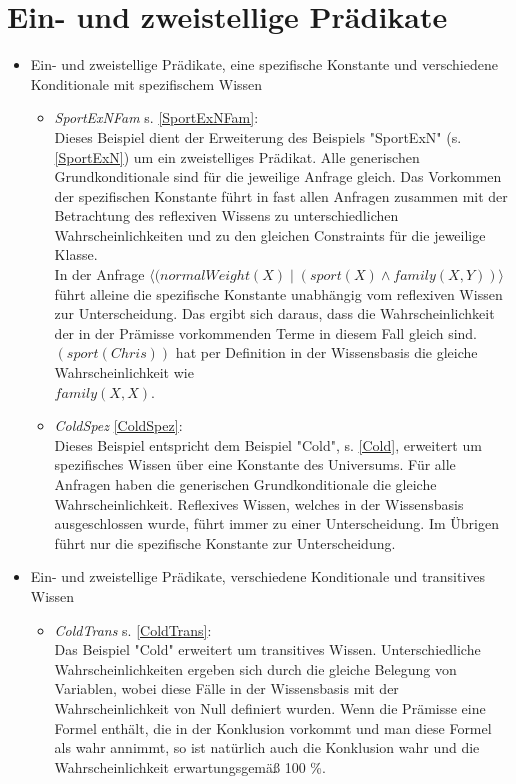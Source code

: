 \documentclass[a4paper, 11pt]{book}
\begin{document}
\section{Ein- und zweistellige Prädikate}
\begin{itemize}
\item{Ein- und zweistellige Prädikate, eine spezifische Konstante und verschiedene Konditionale mit spezifischem Wissen}
\begin{itemize}
	\item \textsl{SportExNFam} \label{BSportExNFam} s. \ref{SportExNFam}:\\
	Dieses Beispiel dient der Erweiterung des Beispiels "{}SportExN"{} (s. \ref{SportExN}) um ein zweistelliges Prädikat. Alle generischen Grundkonditionale sind für die jeweilige Anfrage gleich. Das Vorkommen der spezifischen Konstante führt in fast allen Anfragen zusammen mit der Betrachtung des reflexiven Wissens zu unterschiedlichen Wahrscheinlichkeiten und zu den gleichen Constraints für die jeweilige Klasse.\\
	In der Anfrage $\langle (normalWeight(X) \mid (sport(X) \land family(X,Y)) \rangle$\\ führt alleine die spezifische Konstante unabhängig vom reflexiven Wissen zur Unterscheidung. Das ergibt sich daraus, dass die Wahrscheinlichkeit der in der Prämisse vorkommenden Terme in diesem Fall gleich sind. $(sport(Chris)) $ hat per Definition in der Wissensbasis die gleiche Wahrscheinlichkeit wie \\ $family(X,X)$.
	\item \textsl{ColdSpez} \label{BColdSpez} \ref{ColdSpez}:\\
Dieses Beispiel entspricht dem Beispiel "{}Cold"{}, s. \ref{Cold}, erweitert um spezifisches Wissen über eine Konstante des Universums. Für alle Anfragen haben die generischen Grundkonditionale die gleiche Wahrscheinlichkeit. Reflexives Wissen, welches in der Wissensbasis ausgeschlossen wurde, führt immer zu einer Unterscheidung. Im Übrigen führt nur die spezifische Konstante zur Unterscheidung.
\end{itemize}


\item{Ein- und zweistellige Prädikate, verschiedene Konditionale und transitives Wissen}
\begin{itemize}
	\item \textsl{ColdTrans} \label{BColdTrans} s. \ref{ColdTrans}:\\
Das Beispiel "{}Cold"{} erweitert um transitives Wissen. Unterschiedliche Wahrscheinlichkeiten ergeben sich durch die gleiche Belegung von Variablen, wobei diese Fälle in der Wissensbasis mit der Wahrscheinlichkeit von Null definiert wurden. Wenn die Prämisse eine Formel enthält, die in der Konklusion vorkommt und man diese Formel als wahr annimmt, so ist natürlich auch die Konklusion wahr und die Wahrscheinlichkeit erwartungsgemäß 100 \%.


\end{itemize}
\end{itemize}
\end{document}
